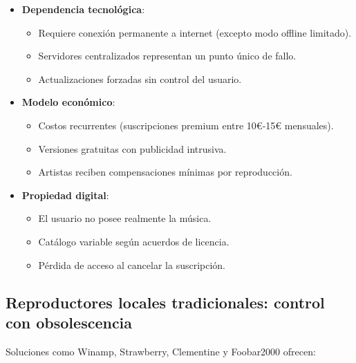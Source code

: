 \documentclass[11pt, a4paper]{article}
\begin{document}
\begin{itemize}
    \item \textbf{Dependencia tecnológica}:
    \begin{itemize}
        \item Requiere conexión permanente a internet (excepto modo offline limitado).
        \item Servidores centralizados representan un punto único de fallo.
        \item Actualizaciones forzadas sin control del usuario.
    \end{itemize}
    
    \item \textbf{Modelo económico}:
    \begin{itemize}
        \item Costos recurrentes (suscripciones premium entre 10€-15€ mensuales).
        \item Versiones gratuitas con publicidad intrusiva.
        \item Artistas reciben compensaciones mínimas por reproducción.
    \end{itemize}
    
    \item \textbf{Propiedad digital}:
    \begin{itemize}
        \item El usuario no posee realmente la música.
        \item Catálogo variable según acuerdos de licencia.
        \item Pérdida de acceso al cancelar la suscripción.
    \end{itemize}
\end{itemize}

\subsection{Reproductores locales tradicionales: control con obsolescencia}

Soluciones como Winamp, Strawberry, Clementine y Foobar2000 ofrecen:
\end{document}
